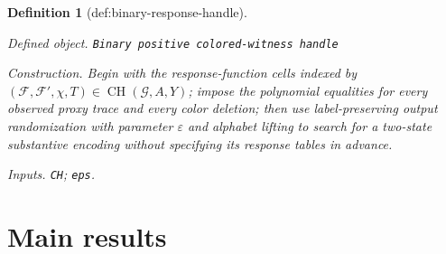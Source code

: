 \documentclass{article}
\newtheorem{definition}{Definition}
\begin{document}
\begin{definition}[def:binary-response-handle]\label{def:binary-response-handle}
\par\smallskip\noindent\emph{Defined object.} \texttt{Binary positive colored-\allowbreak{}witness handle}
\par\smallskip\noindent\emph{Construction.} Begin with the response-function cells indexed by \((\mathcal F,\mathcal F',\chi,T)\in\operatorname{CH}(\mathcal G,A,Y)\); impose the polynomial equalities for every observed proxy trace and every color deletion; then use label-preserving output randomization with parameter \(\varepsilon\) and alphabet lifting to search for a two-state substantive encoding without specifying its response tables in advance.
\par\smallskip\noindent\emph{Inputs.} \texttt{CH}; \texttt{eps}.
\end{definition}

\section{Main results}
\end{document}
